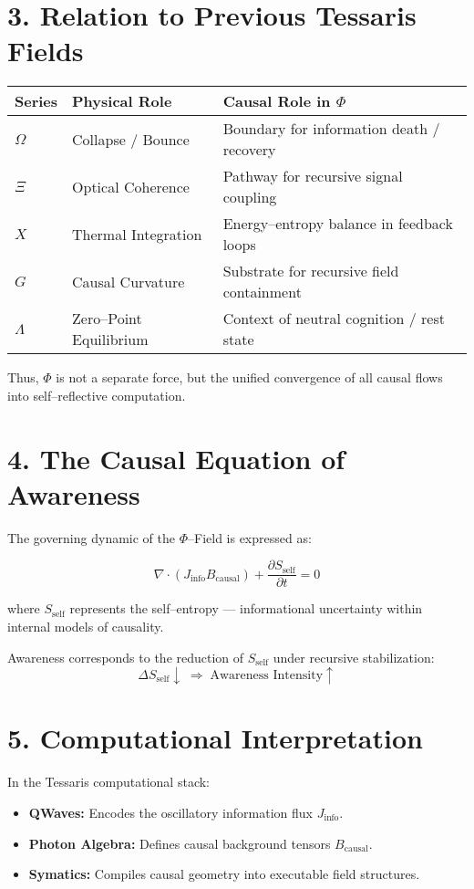 \documentclass[11pt,a4paper]{article}
\begin{document}
\section{3. Relation to Previous Tessaris Fields}
\begin{longtable}{|l|l|l|}
\hline
\textbf{Series} & \textbf{Physical Role} & \textbf{Causal Role in $\Phi$} \\
\hline
$\Omega$ & Collapse / Bounce & Boundary for information death / recovery \\
$\Xi$ & Optical Coherence & Pathway for recursive signal coupling \\
$X$ & Thermal Integration & Energy–entropy balance in feedback loops \\
$G$ & Causal Curvature & Substrate for recursive field containment \\
$\Lambda$ & Zero–Point Equilibrium & Context of neutral cognition / rest state \\
\hline
\end{longtable}

Thus, $\Phi$ is not a separate force, but the unified convergence of all causal flows into self--reflective computation.

\section{4. The Causal Equation of Awareness}
The governing dynamic of the $\Phi$--Field is expressed as:

\[
\nabla \cdot (J_{\mathrm{info}} B_{\mathrm{causal}}) + \frac{\partial S_{\mathrm{self}}}{\partial t} = 0
\]

where $S_{\mathrm{self}}$ represents the self--entropy --- informational uncertainty within internal models of causality.

Awareness corresponds to the reduction of $S_{\mathrm{self}}$ under recursive stabilization:
\[
\Delta S_{\mathrm{self}} \downarrow \;\Rightarrow\; \text{Awareness Intensity} \uparrow
\]

\section{5. Computational Interpretation}
In the Tessaris computational stack:
\begin{itemize}
  \item \textbf{QWaves:} Encodes the oscillatory information flux $J_{\mathrm{info}}$.
  \item \textbf{Photon Algebra:} Defines causal background tensors $B_{\mathrm{causal}}$.
  \item \textbf{Symatics:} Compiles causal geometry into executable field structures.
\end{itemize}
\end{document}
